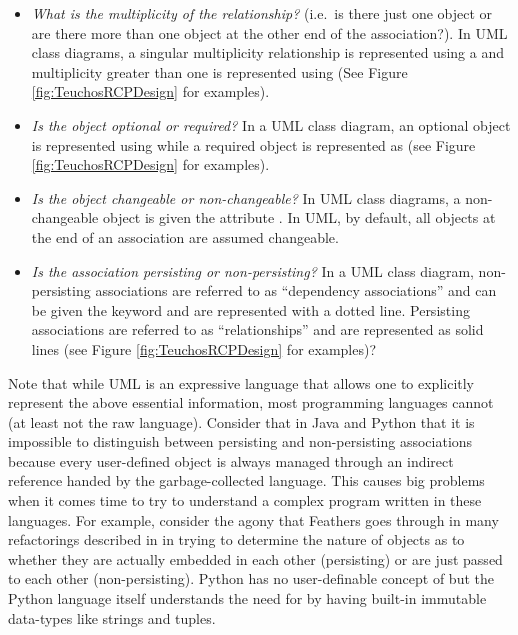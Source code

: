 \documentclass[pdf,ps2pdf,11pt]{SANDreport}
\begin{document}
\begin{itemize}

{}\item\textit{What is the multiplicity of the relationship?}  (i.e.\
is there just one object or are there more than one object at the
other end of the association?).  In UML class diagrams, a singular
multiplicity relationship is represented using a {}\ttt{1} and
multiplicity greater than one is represented using {}
(See Figure {}\ref{fig:TeuchosRCPDesign} for examples).

{}\item\textit{Is the object optional or required?}  In a UML class
diagram, an optional object is represented using {}\ttt{0..1} while
a required object is represented as {}\ttt{1} (see Figure
{}\ref{fig:TeuchosRCPDesign} for examples).

{}\item\textit{Is the object changeable or non-changeable?}  In UML
class diagrams, a non-changeable object is given the attribute
{}.  In UML, by default, all objects at the end
of an association are assumed changeable.

{}\item\textit{Is the association persisting or non-persisting?}  In a
UML class diagram, non-persisting associations are referred to as
``dependency associations'' and can be given the keyword
{} and are represented with a dotted line.
Persisting associations are referred to as ``relationships'' and are
represented as solid lines (see Figure {}\ref{fig:TeuchosRCPDesign}
for examples)?

\end{itemize}

Note that while UML is an expressive language that allows one to
explicitly represent the above essential information, most programming
languages cannot (at least not the raw language).  Consider that in
Java and Python that it is impossible to distinguish between
persisting and non-persisting associations because every user-defined
object is always managed through an indirect reference handed by the
garbage-collected language.  This causes big problems when it comes
time to try to understand a complex program written in these
languages.  For example, consider the agony that Feathers goes through
in many refactorings described in
{}\cite{WorkingEffectivelyWithLegacyCode05} in trying to determine the
nature of objects as to whether they are actually embedded in each
other (persisting) or are just passed to each other (non-persisting).
Python has no user-definable concept of {} but the Python
language itself understands the need for {}\ttt{const} by having
built-in immutable data-types like strings and tuples.
\end{document}
